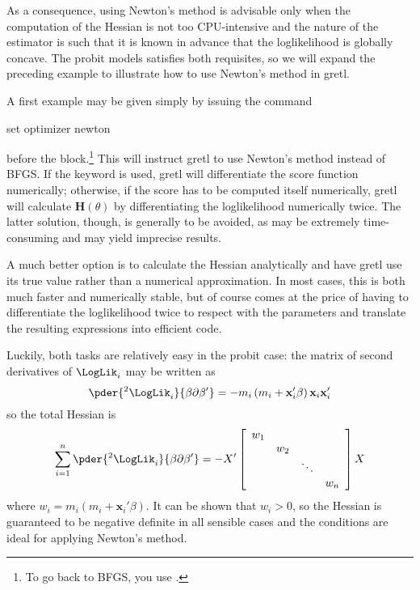 As a consequence, using Newton's method is advisable only when the
computation of the Hessian is not too CPU-intensive and the nature of
the estimator is such that it is known in advance that the
loglikelihood is globally concave. The probit models satisfies both
requisites, so we will expand the preceding example to illustrate how
to use Newton's method in gretl.

A first example may be given simply by issuing the command
\begin{code}
  set optimizer newton
\end{code}
before the  block.\footnote{To go back to BFGS, you use
  .} This will instruct gretl to use
Newton's method instead of BFGS. If the  keyword is used,
gretl will differentiate the score function numerically;
otherwise, if the score has to be computed itself numerically,
gretl will calculate $\mathbf{H}(\theta)$ by differentiating the
loglikelihood numerically twice. The latter solution, though, is
generally to be avoided, as may be extremely time-consuming and may
yield imprecise results.

A much better option is to calculate the Hessian analytically and have
gretl use its true value rather than a numerical approximation. In
most cases, this is both much faster and numerically stable, but of
course comes at the price of having to differentiate the loglikelihood
twice to respect with the parameters and translate the resulting
expressions into efficient  code.

Luckily, both tasks are relatively easy in the probit case: the matrix
of second derivatives of $\LogLik_i$ may be written as
\[
  \pder{{}^2\LogLik_i}{\beta \partial \beta'} = 
  - m_i \left( m_i + \mathbf{x}_i'\beta \right) \mathbf{x}_i \mathbf{x}_i'
\]
so the total Hessian is 
\begin{equation}
  \label{eq:mle-tothess}
  \sum_{i=1}^n \pder{{}^2\LogLik_i}{\beta \partial \beta'} = 
  - X' \left[
    \begin{array}{cccc}
      w_1 & & & \\
      & w_2 & & \\
      & & \ddots & \\
      & & & w_n
    \end{array}
  \right] X 
\end{equation}
where $w_i = m_i \left( m_i + \mathbf{x}_i'\beta \right)$. It can be
shown that $w_i > 0$, so the Hessian is guaranteed to be negative
definite in all sensible cases and the conditions are ideal for
applying Newton's method.

